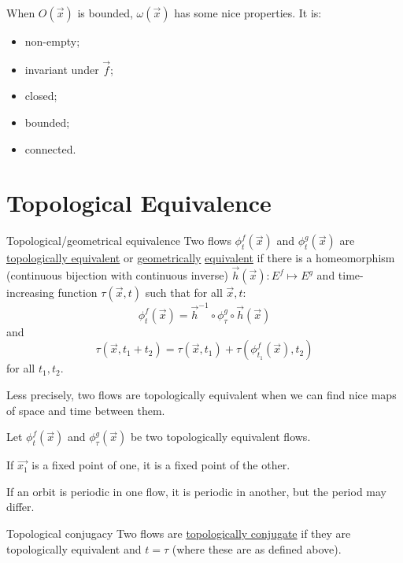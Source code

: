 \documentclass[../Main.tex]{subfiles}
\begin{document}
When $O(\vec{x})$ is bounded, $\omega(\vec{x})$ has some nice properties. It is:
\begin{itemize}
    \item non-empty;
    \item invariant under $\vec{f}$;
    \item closed;
    \item bounded;
    \item connected.
\end{itemize}
\section{Topological Equivalence}
\begin{definition}{Topological/geometrical equivalence}
    Two flows $\phi^f_t(\vec{x})$ and $\phi^g_t(\vec{x})$ are \underline{topologically equivalent} or \underline{geometrically} \underline{equivalent} if there is a homeomorphism (continuous bijection with continuous inverse) $\vec{h}(\vec{x}) : E^f \mapsto E^g$ and time-increasing function $\tau(\vec{x}, t)$ such that for all $\vec{x}, t$:
    \begin{equation*}
        \phi^f_t(\vec{x}) = \vec{h}^{-1} \circ \phi^g_\tau \circ \vec{h}(\vec{x})
    \end{equation*}
    and
    \begin{equation*}
        \tau(\vec{x}, t_1 + t_2) = \tau(\vec{x}, t_1) + \tau(\phi^f_{t_1}(\vec{x}), t_2)
    \end{equation*}
    for all $t_1, t_2$.
\end{definition}
\begin{remark}

    Less precisely, two flows are topologically equivalent when we can find nice maps of space and time between them.
\end{remark}
\begin{propositions}{
        Let $\phi^f_t(\vec{x})$ and $\phi^g_\tau(\vec{x})$ be two topologically equivalent flows.
        \label{propsTopEquiv}
    }
    \item If $\vec{x_1}$ is a fixed point of one, it is a fixed point of the other.
    \item If an orbit is periodic in one flow, it is periodic in another, but the period may differ.
\end{propositions}
\begin{definition}{Topological conjugacy}
    Two flows are \underline{topologically conjugate} if they are topologically equivalent and $t = \tau$ (where these are as defined above).
\end{definition}
\end{document}
